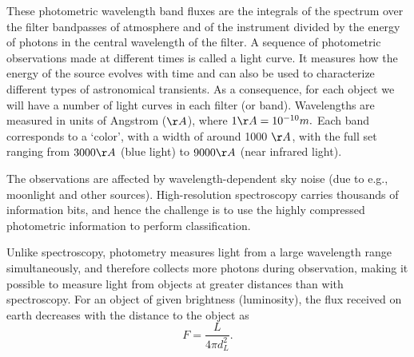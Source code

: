\documentclass[\docopts]{\docclass}
\begin{document}
These photometric wavelength band fluxes are the integrals of the spectrum over the filter bandpasses of atmosphere and of the instrument divided by the energy of photons in the central wavelength of the filter. A sequence of photometric observations made at different times is called a light curve. It measures how the energy of the source evolves with time and can also be used to characterize different types of astronomical transients. As a consequence, for each object we will have a number of light curves in each filter (or band). Wavelengths are measured in units of Angstrom ($\AA$), where $1\AA = 10^{-10} m.$ Each band corresponds to a `color', with a width of around 1000 $\AA$, with the full set ranging from $3000\AA$ (blue light) to $9000\AA$ (near infrared light).

The observations are affected by wavelength-dependent sky noise (due to e.g., moonlight and other sources). 
High-resolution spectroscopy carries thousands of information bits, and hence the challenge is to use the highly compressed photometric information to perform classification.

Unlike spectroscopy, photometry measures light from a large wavelength range simultaneously, and therefore collects more photons during observation, making it possible to measure light from objects at greater distances than with spectroscopy. For an object of given brightness (luminosity), the flux received on earth decreases with the distance to the object as
\begin{equation}
F = \frac{L}{4\pi d_L^2}.
\end{equation}




\end{document}
